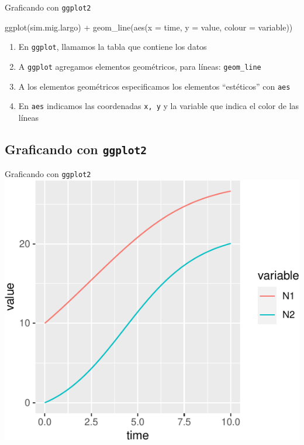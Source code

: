 \documentclass[
  11pt,
  ignorenonframetext,
]{beamer}
\newenvironment{Shaded}{}{}
\newcommand{\AttributeTok}[1]{\textcolor[rgb]{0.49,0.56,0.16}{#1}}
\newcommand{\FunctionTok}[1]{\textcolor[rgb]{0.02,0.16,0.49}{#1}}
\newcommand{\NormalTok}[1]{#1}
\newcommand{\SpecialCharTok}[1]{\textcolor[rgb]{0.25,0.44,0.63}{#1}}
\begin{document}
\begin{frame}[fragile]{Graficando con \texttt{ggplot2}}
\begin{Shaded}
\begin{Highlighting}[]
\FunctionTok{ggplot}\NormalTok{(sim.mig.largo) }\SpecialCharTok{+} \FunctionTok{geom\_line}\NormalTok{(}\FunctionTok{aes}\NormalTok{(}\AttributeTok{x =}\NormalTok{ time, }
                                      \AttributeTok{y =}\NormalTok{ value, }
                                      \AttributeTok{colour =}\NormalTok{ variable))}
\end{Highlighting}
\end{Shaded}

\begin{enumerate}
\item
  En \texttt{ggplot}, llamamos la tabla que contiene los datos
\item
  A \texttt{ggplot} agregamos elementos geométricos, para líneas:
  \texttt{geom\_line}
\item
  A los elementos geométricos especificamos los elementos ``estéticos''
  con \texttt{aes}
\item
  En \texttt{aes} indicamos las coordenadas \texttt{x,\ y} y la variable
  que indica el color de las líneas
\end{enumerate}
\end{frame}

\hypertarget{graficando-con-ggplot2-1}{%
\subsection{\texorpdfstring{Graficando con
\texttt{ggplot2}}{Graficando con ggplot2}}\label{graficando-con-ggplot2-1}}

\begin{frame}{Graficando con \texttt{ggplot2}}
\includegraphics{deSolve_files/figure-beamer/unnamed-chunk-26-1.pdf}
\end{frame}
\end{document}
